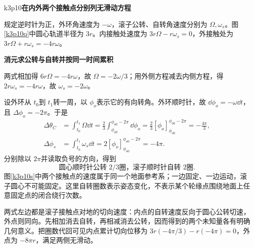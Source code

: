 \LectureAnswerSection



\begin{drillsolution}{k3p10}\textbf{在内外两个接触点分别列无滑动方程}\par\nobreak
规定逆时针为正，外环角速度为 $-\omega$，滚子公转、自转角速度分别为 $\Omega,\omega_s$。图\ref{k3p10q}中圆心轨道半径为 $3r$。内接触处速度为 $3r\Omega-r\omega_s=0$，外接触处为 $3r\Omega+r\omega_s=-4r\omega$。



\par\medskip{}\noindent\textbf{消元求公转与自转并按同一时间累积}\par\nobreak
两式相加得 $6r\Omega=-4r\omega$，故 $\Omega=-2\omega/3$；用外侧方程减去内侧方程，得 $2r\omega_s=-4r\omega$，故 $\omega_s=-2\omega$。

设外环从 $t_0$到 $t_1$转一周，以 $\phi_o$表示它的有向转角。外环顺时针，故 $\dd\phi_o=-\omega\dd t$，且 $\Delta\phi_o=-2\pi$。于是
\begin{align*}
 \Delta\theta_C&=\int_{t_0}^{t_1}\Omega\dd t
 =\frac23\int_{\phi_{o0}}^{\phi_{o0}-2\pi}\dd\phi_o
 =\frac23[\phi_o]_{\phi_{o0}}^{\phi_{o0}-2\pi}=-\frac{4\pi}{3},\\
 \Delta\phi_s&=\int_{t_0}^{t_1}\omega_s\dd t
 =2[\phi_o]_{\phi_{o0}}^{\phi_{o0}-2\pi}=-4\pi.
\end{align*}
分别除以 $2\pi$并读取负号的方向，得到
\[\boxed{\text{圆心顺时针公转 }2/3\text{圈，滚子顺时针自转 }2\text{圈}}.\]
图\ref{k3p10s}中两个接触点的速度属于同一个地面参考系；一边固定、一边运动，滚子圆心不可能固定。这里自转圈数表示姿态变化，不表示某个轮缘点围绕地面上任意固定点的闭合绕行次数。

两式左边都是滚子接触点对地的切向速度：内点的自转速度反向于圆心公转切速，外点则同向。先相加消去自转，再相减消去公转，因而得到的两个未知量各有明确几何意义。把圈数代回可见内点累计切向位移为 $3r(-4\pi/3)-r(-4\pi)=0$，外点为 $-8\pi r$，满足两侧无滑动。\end{drillsolution}

